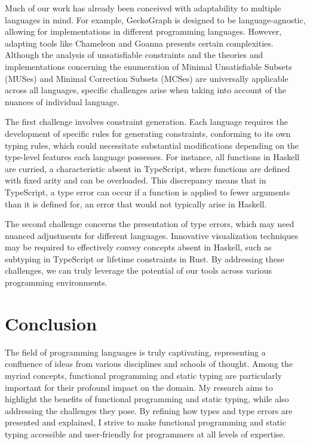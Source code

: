 Much of our work has already been conceived with adaptability to multiple languages in mind. For example, GeckoGraph is designed to be language-agnostic, allowing for implementations in different programming languages. However, adapting tools like Chameleon and Goanna presents certain complexities. Although the analysis of unsatisfiable constraints and the theories and implementations concerning the enumeration of Minimal Unsatisfiable Subsets (MUSes) and Minimal Correction Subsets (MCSes) are universally applicable across all languages, specific challenges arise when taking into account of the nuances of individual language.

The first challenge involves constraint generation. Each language requires the development of specific rules for generating constraints, conforming to its own typing rules, which could necessitate substantial modifications depending on the type-level features each language possesses. For instance, all functions in Haskell are curried, a characteristic absent in TypeScript, where functions are defined with fixed arity and can be overloaded. This discrepancy means that in TypeScript, a type error can occur if a function is applied to fewer arguments than it is defined for, an error that would not typically arise in Haskell.

The second challenge concerns the presentation of type errors, which may need nuanced adjustments for different languages. Innovative visualization techniques may be required to effectively convey concepts absent in Haskell, such as subtyping in TypeScript or lifetime constraints in Rust. By addressing these challenges, we can truly leverage the potential of our tools across various programming environments.


\section{Conclusion}


The field of programming languages is truly captivating, representing a confluence of ideas from various disciplines and schools of thought. Among the myriad concepts, functional programming and static typing are particularly important for their profound impact on the domain. My research aims to highlight the benefits of functional programming and static typing, while also addressing the challenges they pose. By refining how types and type errors are presented and explained, I strive to make functional programming and static typing accessible and user-friendly for programmers at all levels of expertise.

